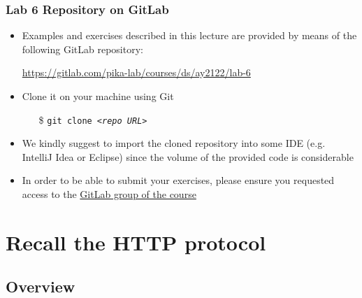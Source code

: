 \documentclass[presentation]{beamer}\mode<presentation>{\usetheme{AMSBolognaFC}}
\newcommand{\labN}{6}
\newcommand{\labGroup}{https://gitlab.com/pika-lab/courses/ds/ay2122}
\newcommand{\labRepo}{\labGroup/lab-\labN}
\begin{document}
\begin{frame}
\frametitle{Lab \labN{} Repository on GitLab}

	\begin{itemize}
		\item Examples and exercises described in this lecture are provided by means of the following GitLab repository:
		\begin{center}
			\url{\labRepo}
		\end{center}

		\vfill

		\item Clone it on your machine using Git
		\begin{itemize}
		    \item[\$] \texttt{git clone \textit{<repo URL>}}
		\end{itemize}

		\vfill

		\item We kindly suggest to import the cloned repository into some IDE (e.g. IntelliJ Idea or Eclipse) since the volume of the provided code is considerable

		\vfill

		\item In order to be able to submit your exercises, please ensure you requested access to the \href{\labGroup}{GitLab group of the course}
	\end{itemize}

\end{frame}


\section{Recall the HTTP protocol}

\subsection{Overview}
\end{document}
